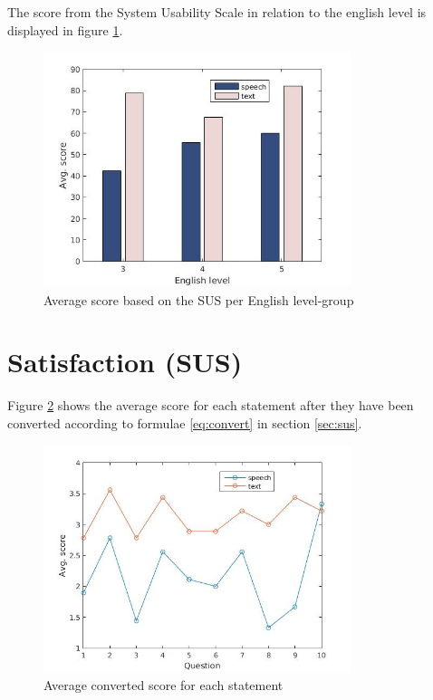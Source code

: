 The score from the System Usability Scale in relation to the english level is displayed in figure \ref{eng_score}.

\begin{figure}[ht]
  \centering
  \includegraphics[width=0.8\textwidth]{images/english_score.jpg}
  \caption{Average score based on the SUS per English level-group}\label{eng_score}
\end{figure}


\section{Satisfaction (SUS)}
Figure \ref{fig:sus_table} shows the average score for each statement after they have been converted according to formulae \ref{eq:convert} in section \ref{sec:sus}. 
\begin{figure}[ht]
  \centering
  \includegraphics[width=0.8\textwidth]{images/sus.jpg}
  \caption{Average converted score for each statement}\label{fig:sus_table}
\end{figure}

